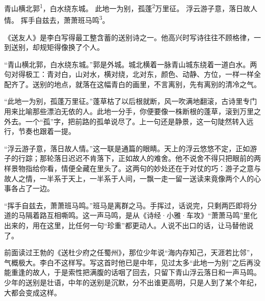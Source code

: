 
\begin{poem}
青山横北郭\textsuperscript{1}，白水绕东城。
此地一为别，孤蓬\textsuperscript{2}万里征。
浮云游子意，落日故人情。
挥手自兹去，萧萧班马鸣\textsuperscript{3}。
\end{poem}

\begin{annotations}
\end{annotations}

\begin{appreciation}
《送友人》是李白写得最工整含蓄的送别诗之一。他高兴时写诗往往不顾格律，一到送别，却规矩得像换了个人。

“青山横北郭，白水绕东城。”郭是外城。城北横着一脉青山城东绕着一道白水。两句对得极工：青对白，山对水，横对绕，北对东，颜色、动静、方位，一样一样全配齐了。送别的地点，就落在这幅青白的画里，不言离别，先有离别的清冷之气。

“此地一为别，孤蓬万里征。”蓬草枯了以后根就断，风一吹满地翻滚，古诗里专门用来比喻那些漂泊无依的人。此地一分手，你便要像一株断根的蓬草，滚到万里之外去。一个“孤”字，把前路的孤单说尽了。上一句还是静景，这一句陡然转入远行，节奏也跟着一提。

“浮云游子意，落日故人情。”这一联是通篇的眼睛。天上的浮云悠悠不定，正如游子的行踪；那轮落日迟迟不肯落下，正如故人的难舍。他不说舍不得只把眼前的两样景物指给你看，情便全藏在里头了。这两句的妙处还在于对仗的巧：游子之意与故人之情，一半系于天上，一半系于人间，一飘一走一留一送读来竟像两个人的心事各占了一边。

“挥手自兹去，萧萧班马鸣。”班马是离群之马。手挥过，话说完，只剩两匹即将分道的马隔着路互相嘶鸣。这一声马鸣，是从《诗经·小雅·车攻》“萧萧马鸣”里化出来的，用在这里，比任何一句“珍重”都更动人。人说不出口的话，让马替他说了。

前面读过王勃的《送杜少府之任蜀州》，那位少年说“海内存知己，天涯若比邻”，气概极大。李白不这样写。写这首时他已是中年，见过太多“此地一为别”之后再没能重逢的故人，于是索性把满腹的话咽了回去，只留下青山浮云落日和一声马鸣。少年的送别是壮语，中年的送别是沉默，分不出谁更高明，只是人到了某个年纪，大都会变成这样。
\end{appreciation}
